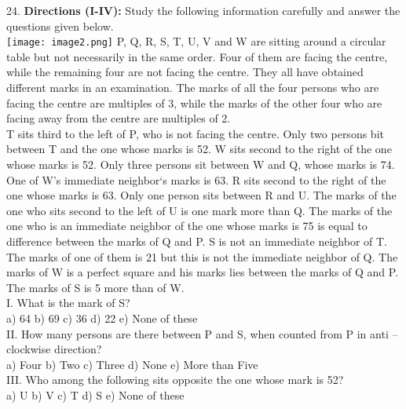 \documentclass[
]{article}
\begin{document}
24. \textbf{Directions (I-IV):} Study the following information carefully and answer the questions given
below.\\
\texttt{[image: image2.png]}
P, Q, R, S, T, U, V and W are sitting around a circular table but not necessarily in the same
order. Four of them are facing the centre, while the remaining four are not facing the centre.
They all have obtained different marks in an examination. The marks of all the four persons
who are facing the centre are multiples of 3, while the marks of the other four who are
facing away from the centre are multiples of 2.\\
T sits third to the left of P, who is not facing the centre. Only two persons bit between T and
the one whose marks is 52. W sits second to the right of the one whose marks is 52. Only
three persons sit between W and Q, whose marks is 74. One of W’s immediate neighbor‘s
marks is 63. R sits second to the right of the one whose marks is 63. Only one person sits
between R and U. The marks of the one who sits second to the left of U is one mark more
than Q. The marks of the one who is an immediate neighbor of the one whose marks is 75 is
equal to difference between the marks of Q and P. S is not an immediate neighbor of T. The
marks of one of them is 21 but this is not the immediate neighbor of Q. The marks of W is a
perfect square and his marks lies between the marks of Q and P. The marks of S is 5 more
than of W.\\
I. What is the mark of S?\\
a) 64 \hspace{2mm}b) 69 \hspace{2mm}c) 36 \hspace{2mm}d) 22 \hspace{2mm}e) None of these\\

II. How many persons are there between P and S, when counted from P in anti – clockwise
direction?\\
a) Four \hspace{2mm}b) Two \hspace{2mm}c) Three \hspace{2mm}d) None \hspace{2mm}e) More than Five\\

III. Who among the following sits opposite the one whose mark is 52?\\
a) U \hspace{2mm}b) V \hspace{2mm}c) T \hspace{2mm}d) S \hspace{2mm}e) None of these\\
\end{document}
